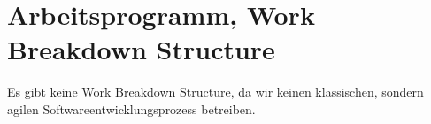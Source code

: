 
\section{Arbeitsprogramm, Work Breakdown Structure}

Es gibt keine Work Breakdown Structure, da wir keinen klassischen, sondern
agilen Softwareentwicklungsprozess betreiben.
